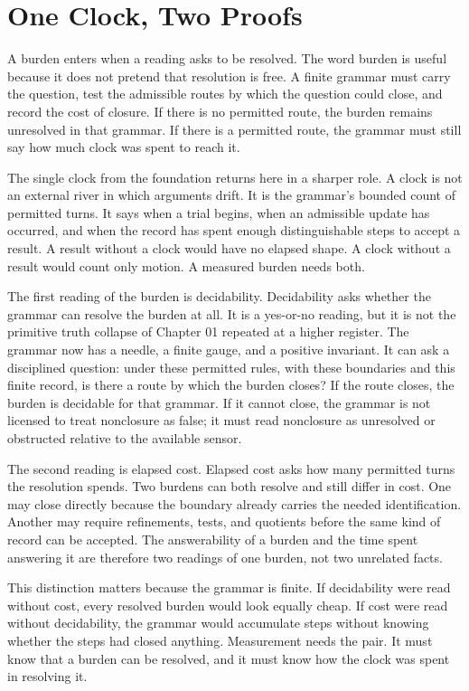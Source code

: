 \section{One Clock, Two Proofs}

A burden enters when a reading asks to be resolved. The word burden is useful
because it does not pretend that resolution is free. A finite grammar must
carry the question, test the admissible routes by which the question could
close, and record the cost of closure. If there is no permitted route, the
burden remains unresolved in that grammar. If there is a permitted route,
the grammar must still say how much clock was spent to reach it.

The single clock from the foundation returns here in a sharper role. A clock
is not an external river in which arguments drift. It is the grammar's
bounded count of permitted turns. It says when a trial begins, when an
admissible update has occurred, and when the record has spent enough
distinguishable steps to accept a result. A result without a clock would
have no elapsed shape. A clock without a result would count only motion. A
measured burden needs both.

The first reading of the burden is decidability. Decidability asks whether
the grammar can resolve the burden at all. It is a yes-or-no reading, but it
is not the primitive truth collapse of Chapter 01 repeated at a higher
register. The grammar now has a needle, a finite gauge, and a positive
invariant. It can ask a disciplined question: under these permitted rules,
with these boundaries and this finite record, is there a route by which the
burden closes? If the route closes, the burden is decidable for that
grammar. If it cannot close, the grammar is not licensed to treat nonclosure
as false; it must read nonclosure as unresolved or obstructed relative to the
available sensor.

The second reading is elapsed cost. Elapsed cost asks how many permitted
turns the resolution spends. Two burdens can both resolve and still differ
in cost. One may close directly because the boundary already carries the
needed identification. Another may require refinements, tests, and
quotients before the same kind of record can be accepted. The answerability
of a burden and the time spent answering it are therefore two readings of one
burden, not two unrelated facts.

This distinction matters because the grammar is finite. If decidability were
read without cost, every resolved burden would look equally cheap. If cost
were read without decidability, the grammar would accumulate steps without
knowing whether the steps had closed anything. Measurement needs the pair.
It must know that a burden can be resolved, and it must know how the clock
was spent in resolving it.

